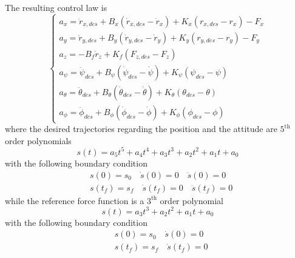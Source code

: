 The resulting control law is
\[
\begin{cases}
  a_x = \ddot{r}_{x,des} + B_x (\dot{r}_{x,des} - \dot{r}_x) + K_x (r_{x,des} - r_x) - F_x \\
  a_y = \ddot{r}_{y,des} + B_y (\dot{r}_{y,des} - \dot{r}_y) + K_y (r_{y,des} - r_y) - F_y \\
  a_z = - B_f \dot{r}_z + K_f(F_{z,des} - F_z) \\
  a_{\psi} = \ddot{\psi}_{des} + B_{\psi} (\dot{\psi}_{des} - \dot{\psi}) + K_{\psi} (\psi_{des} - \psi) \\
  a_{\theta} = \ddot{\theta}_{des} + B_{\theta} (\dot{\theta}_{des} - \dot{\theta}) + K_{\theta} (\theta_{des} - \theta) \\
  a_{\phi} = \ddot{\phi}_{des} + B_{\phi} (\dot{\phi}_{des} - \dot{\phi}) + K_{\phi} (\phi_{des} - \phi)
\end{cases}
\]
where the desired trajectories regarding the position and the attitude are $5^\text{th}$ order polynomials
\[
s(t) = a_5 t^5 + a_4 t^4 + a_3 t^3 + a_2 t^2 +a_1 t + a_0
\]
with the following boundary condition
\[
\begin{split}
  &s(0) = s_0 \quad \dot{s}(0) = 0 \quad \ddot{s}(0) = 0\\
  &s(t_f) = s_f \quad \dot{s}(t_f) = 0 \quad \ddot{s}(t_f) = 0
\end{split}
\]
while the reference force function is a $3^\text{th}$ order polynomial
\[
s(t) = a_3 t^3 + a_2 t^2 +a_1 t + a_0
\] 
with the following boundary condition
\[
\begin{split}
  &s(0) = s_0 \quad \dot{s}(0) = 0\\
  &s(t_f) = s_f \quad \dot{s}(t_f) = 0
\end{split}
\]
\newpage
